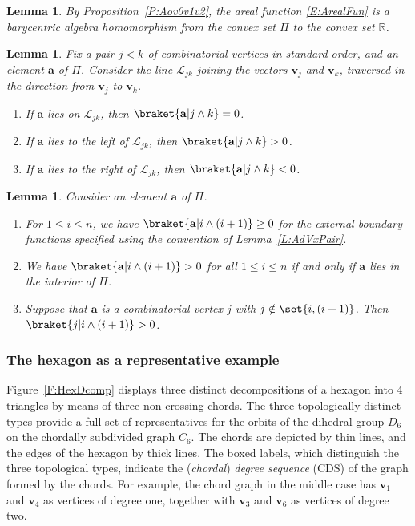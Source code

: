 \documentclass[12pt]{amsart}
\theoremstyle{plain}
\newtheorem{lemma}[theorem]{Lemma}
\theoremstyle{definition}
\numberwithin{equation}{section}
\begin{document}
\begin{lemma}\label{L:ArFuBaHo}
By Proposition~\ref{P:Aov0v1v2}, the areal function \eqref{E:ArealFun} is a barycentric algebra homomorphism from the convex set $\Pi$ to the convex set $\mathbb R$.
\end{lemma}


\begin{lemma}\label{L:ArealFun}
Fix a pair $j<k$ of combinatorial vertices in standard order, and an element $\mathbf a$ of $\Pi$. Consider the line $\mathcal L_{jk}$ joining the vectors $\mathbf v_j$ and $\mathbf v_k$, traversed in the direction from $\mathbf v_j$ to $\mathbf v_k$.
\begin{enumerate}
\item[$(\mathrm a)$]
If $\mathbf a$ lies on $\mathcal L_{jk}$, then $\braket{\mathbf a|j\wedge k}=0$.
\item[$(\mathrm b)$]
If $\mathbf a$ lies to the left of $\mathcal L_{jk}$, then $\braket{\mathbf a|j\wedge k}>0$.
\item[$(\mathrm c)$]
If $\mathbf a$ lies to the right of $\mathcal L_{jk}$, then $\braket{\mathbf a|j\wedge k}<0$.
\end{enumerate}
\end{lemma}


\begin{lemma}\label{L:aiiplus1}
Consider an element $\mathbf a$ of $\Pi$.
\begin{enumerate}
\item[$(\mathrm a)$]
For $1\le i\le n$, we have $\braket{\mathbf a|i\wedge(i+1)}\ge0$ for the external boundary functions specified using the convention of Lemma~\ref{L:AdVxPair}.
\item[$(\mathrm b)$]
We have $\braket{\mathbf a|i\wedge(i+1)}>0$ for all $1\le i\le n$ if and only if $\mathbf a$ lies in the interior of $\Pi$.
\item[$(\mathrm c)$]
Suppose that $\mathbf a$ is a combinatorial vertex $j$ with $j\notin\set{i,(i+1)}$. Then $\braket{j|i\wedge(i+1)}>0$.
\end{enumerate}
\end{lemma}


\subsubsection{The hexagon as a representative example}


Figure~\ref{F:HexDcomp} displays three distinct decompositions of a hexagon into $4$ triangles by means of three non-crossing chords. The three topologically distinct types provide a full set of representatives for the orbits of the dihedral group $D_6$ on the chordally subdivided graph $C_6$. The chords are depicted by thin lines, and the edges of the hexagon by thick lines. The boxed labels, which distinguish the three topological types, indicate the (\emph{chordal}) \emph{degree sequence} (CDS) of the graph formed by the chords.
For example, the chord graph in the middle case has $\mathbf v_1$ and $\mathbf v_4$ as vertices of degree one, together with $\mathbf v_3$ and $\mathbf v_6$ as vertices of degree two.
\end{document}
